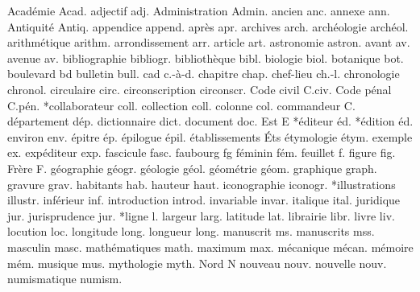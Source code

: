 {Académie}          Acad.%
adjectif            adj.%
{Administration}    Admin.%
ancien              anc.%
annexe              ann.%
{Antiquité}         Antiq.%
appendice           append.%
après               apr.%
archives            arch.%
archéologie         archéol.%
arithmétique        arithm.%
arrondissement      arr.%
article             art.%
astronomie          astron.%
avant               av.%
avenue              av.%
bibliographie       bibliogr.%
bibliothèque    bibl.%
biologie            biol.%
botanique           bot.%
boulevard           bd%
bulletin            bull.%
cad                 \noexpand\hbox{c.-à-d.}%
chapitre            chap.%
chef-lieu           ch.-l.%
chronologie         chronol.%
circulaire          circ.%
circonscription     circonscr.%
{Code civil}        C.civ.%
{Code pénal}        C.pén.%
*collaborateur      coll.%
collection          coll.%
colonne             col.%
commandeur          C.%
département         dép.%
dictionnaire        dict.%
document            doc.%
{Est}               E%
*éditeur            éd.%
*édition            éd.%
environ             env.%
épitre              ép.%
épilogue            épil.%
établissements      Éts%
étymologie          étym.%
exemple             ex.%
expéditeur          exp.%
fascicule           fasc.%
faubourg            fg%
féminin             fém.%
feuillet            f.%
figure              fig.%
Frère               F.%
géographie          géogr.%
géologie            géol.%
géométrie           géom.%
graphique           graph.%
gravure             grav.%
habitants           hab.%
hauteur             haut.%
iconographie        iconogr.%
*illustrations      illustr.%
inférieur           inf.%
introduction        introd.%
invariable          invar.%
italique            ital.%
juridique           jur.%
jurisprudence       jur.%
*ligne              l.%
largeur             larg.%
latitude            lat.%
librairie           libr.%
livre               liv.%
locution            loc.%
longitude           long.%
longueur            long.%
manuscrit           ms.%
manuscrits          mss.%
masculin            masc.%
mathématiques       math.%
maximum             max.%
mécanique           mécan.%
mémoire             mém.%
musique             mus.%
mythologie          myth.%
{Nord}              N%
nouveau             nouv.%
nouvelle            nouv.%
numismatique        numism.%
